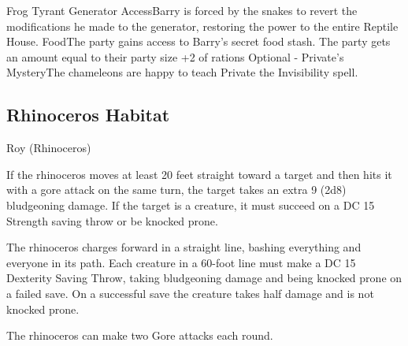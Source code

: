 \begin{DndQuestHook}[width=0.5\textwidth - 4pt]{Frog Tyrant}
	{%
		{Generator Access}{Barry is forced by the snakes to revert the modifications he made to the generator, restoring the power to the entire Reptile House.}%
		{Food}{The party gains access to Barry's secret food stash. The party gets an amount equal to their party size +2 of rations}
		{Optional - Private's Mystery}{The chameleons are happy to teach Private the Invisibility spell.}
	}%
\end{DndQuestHook}

\subsection*{ Rhinoceros Habitat}
\begin{DndMonster}[width=0.5\textwidth - 4pt]{Roy (Rhinoceros)}

	\DndMonsterBasics[
		armor-class = {17 (Natural Armor)},
		hit-points  = {\DndDice{20d10 + 40}},
		speed       = {40 ft.},
	]

	\renewcommand{\AbilityScoreSpacer}{~}

	\DndMonsterAbilityScores[
		str = 21,
		dex = 8,
		con = 15,
		int = 2,
		wis = 12,
		cha = 6,
	]

	\DndMonsterDetails[
		skills = {Perception +1},
		senses = {passive Perception 11},
		languages = {Common},
		challenge = 6,
	]

	If the rhinoceros moves at least 20 feet straight toward a target and then hits it with a gore attack on the same turn, the target takes an extra 9 (2d8) bludgeoning damage. If the target is a creature, it must succeed on a DC 15 Strength saving throw or be knocked prone.
	
	 The rhinoceros charges forward in a straight line, bashing everything and everyone in its path. Each creature in a 60-foot line must make a DC 15 Dexterity Saving Throw, taking  bludgeoning damage and being knocked prone on a failed save. On a successful save the creature takes half damage and is not knocked prone.
	
	The rhinoceros can make two Gore attacks each round.
	
	\DndMonsterAttack[
		name=Gore,
		distance=melee, %
		mod=+7,
		reach=5,
		targets=one target,
		dmg={\DndDice{2d8 + 5}},
		dmg-type=piercing,
	]
\end{DndMonster}

